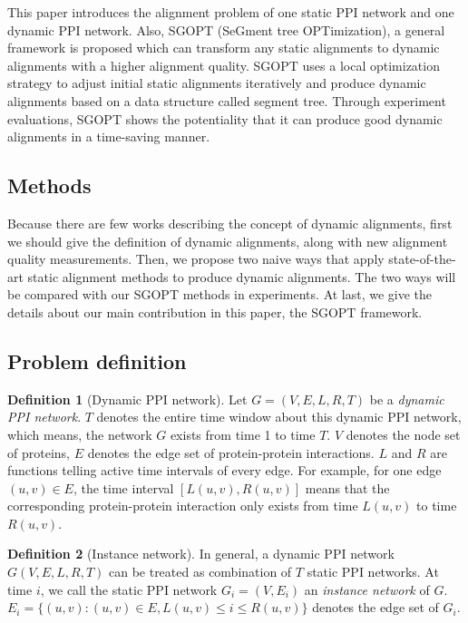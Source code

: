 \documentclass{bioinfo}
\theoremstyle{definition}
\newtheorem{defn}{\textbf{Definition}}[section]%
\begin{document}
This paper introduces the alignment problem of one static PPI network and one dynamic PPI network. Also, SGOPT (SeGment tree OPTimization), a general framework is proposed which can transform any static alignments to dynamic alignments with a higher alignment quality. SGOPT uses a local optimization strategy to adjust initial static alignments iteratively and produce dynamic alignments based on a data structure called segment tree. Through experiment evaluations, SGOPT shows the potentiality that it can produce good dynamic alignments in a time-saving manner.


\begin{methods}
\section{Methods}
Because there are few works describing the concept of dynamic alignments, first we should give the definition of dynamic alignments, along with new alignment quality measurements. Then, we propose two naive ways that apply state-of-the-art static alignment methods to produce dynamic alignments. The two ways will be compared with our SGOPT methods in experiments. At last, we give the details about our main contribution in this paper, the SGOPT framework.
\subsection{Problem definition}
\begin{defn}[Dynamic PPI network]
\label{defndppi}
Let $G=(V,E,L,R,T)$ be a \textit{dynamic PPI network}. $T$ denotes the entire time window about this dynamic PPI network, which means, the network $G$ exists from time 1 to time $T$. $V$ denotes the node set of proteins, $E$ denotes the edge set of protein-protein interactions. $L$ and $R$ are functions telling active time intervals of every edge. For example, for one edge $(u,v)\in E$, the time interval $[L(u,v),R(u,v)]$ means that the corresponding protein-protein interaction only exists from time $L(u,v)$ to time $R(u,v)$.
\end{defn}

\begin{defn}[Instance network]
\label{defninstance}
In general, a dynamic PPI network $G(V,E,L,R,T)$ can be treated as combination of $T$ static PPI networks. At time $i$, we call the static PPI network $G_i=(V,E_i)$ an \textit{instance network} of $G$. $E_i=\{(u,v):(u,v)\in E,L(u,v)\leq i\leq R(u,v)\}$ denotes the edge set of $G_i$.
\end{defn}


\end{methods}
\end{document}
